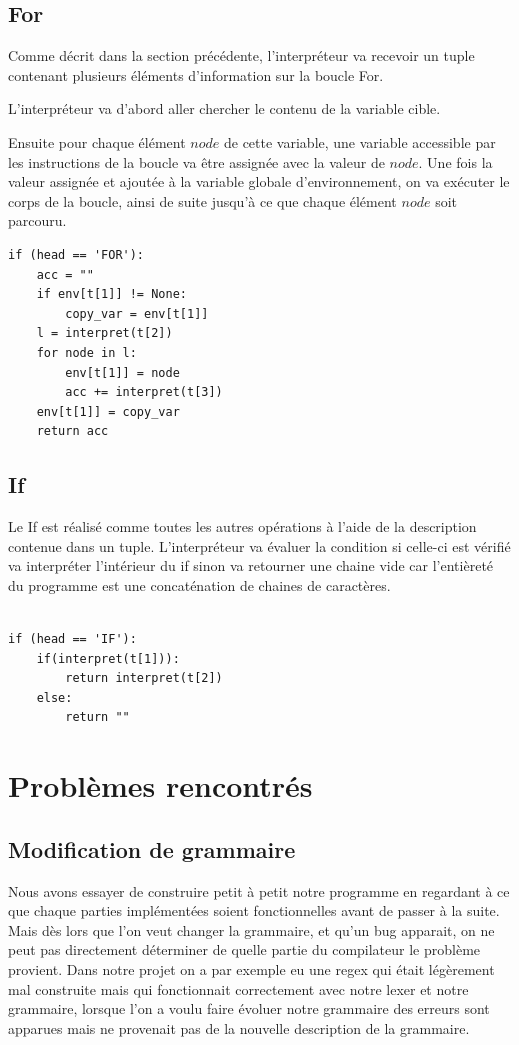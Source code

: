 \documentclass[10pt,a4paper]{article}
\begin{document}
\subsection{For}
Comme décrit dans la section précédente, l'interpréteur va recevoir un tuple contenant plusieurs éléments d'information sur
la boucle For.

L'interpréteur va d'abord aller chercher le contenu de la variable cible.

Ensuite pour chaque élément $node$ de cette variable, une variable accessible par les instructions de la boucle va être assignée avec la valeur de $node$.
Une fois la valeur assignée et ajoutée à la variable globale d'environnement, on va exécuter le corps de la boucle, ainsi de suite jusqu'à ce que chaque élément $node$ soit parcouru.
\begin{lstlisting}
if (head == 'FOR'):
	acc = ""
	if env[t[1]] != None:
		copy_var = env[t[1]]
	l = interpret(t[2])
	for node in l:
		env[t[1]] = node
		acc += interpret(t[3])
	env[t[1]] = copy_var
	return acc
\end{lstlisting}
\subsection{If}
Le If est réalisé comme toutes les autres opérations à l'aide de la description contenue dans un tuple.
L'interpréteur va évaluer la condition si celle-ci est vérifié va interpréter l'intérieur du if sinon va retourner une chaine vide car l'entièreté du programme est une concaténation de chaines de caractères.
\begin{lstlisting}

if (head == 'IF'):
	if(interpret(t[1])):
		return interpret(t[2])
	else:
		return ""
\end{lstlisting}


\section{Problèmes rencontrés}
\subsection{Modification de grammaire}
Nous avons essayer de construire petit à petit notre programme en regardant à ce que chaque parties implémentées soient fonctionnelles avant de passer à la suite.
Mais dès lors que l'on veut changer la grammaire, et qu'un bug apparait, on ne peut pas directement déterminer de quelle partie du compilateur le problème provient.
Dans notre projet on a par exemple eu une regex qui était légèrement mal construite mais qui fonctionnait correctement avec notre lexer et notre grammaire, lorsque l'on a voulu faire évoluer notre grammaire des erreurs sont apparues mais ne provenait pas de la nouvelle description de la grammaire.
\end{document}
